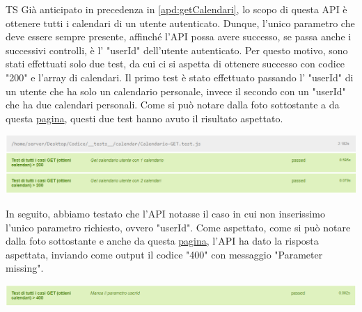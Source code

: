 \begin{listaPersonale}{TS}
                Già anticipato in precedenza in \ref{apd:getCalendari}, lo scopo di questa API è ottenere tutti i calendari di un utente autenticato. Dunque, l'unico parametro che deve essere sempre presente, affinché l'API possa avere successo, se passa anche i successivi controlli, è l' "userId" dell'utente autenticato. Per questo motivo, sono stati effettuati solo due test, da cui ci si aspetta di ottenere successo con codice "200" e l'array di calendari. Il primo test è stato effettuato passando l' "userId" di un utente che ha solo un calendario personale, invece il secondo con un "userId" che ha due calendari personali. Come si può notare dalla foto sottostante a da questa \href{https://plan-it.it/test-report.html} {pagina}, questi due test hanno avuto il risultato aspettato.
                \begin{center}
                        \includegraphics[width=1\textwidth, height=0.1\textheight]{img/png/tests/CalendarioGet/200_getCalendari.png}
                \end{center}
                In seguito, abbiamo testato che l'API notasse il caso in cui non inserissimo l'unico parametro richiesto, ovvero "userId". Come aspettato, come si può notare dalla foto sottostante e anche da questa \href{https://plan-it.it/test-report.html} {pagina}, l'API ha dato la risposta aspettata, inviando come output il codice "400" con messaggio "Parameter missing".
                \begin{center}
                        \includegraphics[width=1\textwidth, height=0.04\textheight]{img/png/tests/CalendarioGet/400_getCalendari.png}

\end{center}
\end{listaPersonale}
